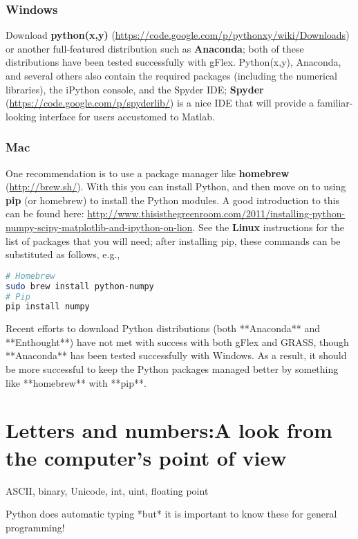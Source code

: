 \documentclass[a4paper,10pt]{amsart}
\begin{document}
\subsubsection{Windows}

Download \textbf{python(x,y)} (\url{https://code.google.com/p/pythonxy/wiki/Downloads}) or another full-featured distribution such as \textbf{Anaconda}; both of these distributions have been tested successfully with gFlex. Python(x,y), Anaconda, and several others also contain the required packages (including the numerical libraries), the iPython console, and the Spyder IDE; \textbf{Spyder} (\url{https://code.google.com/p/spyderlib/}) is a nice IDE that will provide a familiar-looking interface for users accustomed to Matlab.

\subsubsection{Mac}

One recommendation is to use a package manager like \textbf{homebrew} (\url{http://brew.sh/}). With this you can install Python, and then move on to using \textbf{pip} (or homebrew) to install the Python modules. A good introduction to this can be found here: \url{http://www.thisisthegreenroom.com/2011/installing-python-numpy-scipy-matplotlib-and-ipython-on-lion}. See the \textbf{Linux} instructions for the list of packages that you will need; after installing pip, these commands can be substituted as follows, e.g.,

\begin{lstlisting}[language=sh]
# Homebrew
sudo brew install python-numpy
# Pip
pip install numpy
\end{lstlisting}

Recent efforts to download Python distributions (both **Anaconda** and **Enthought**) have not met with success with both gFlex and GRASS, though **Anaconda** has been tested successfully with Windows. As a result, it should be more successful to keep the Python packages managed better by something like **homebrew** with **pip**.

\section{Letters and numbers:A look from the computer's point of view}

ASCII, binary, Unicode, int, uint, floating point

Python does automatic typing *but* it is important to know these for general programming!
\end{document}
